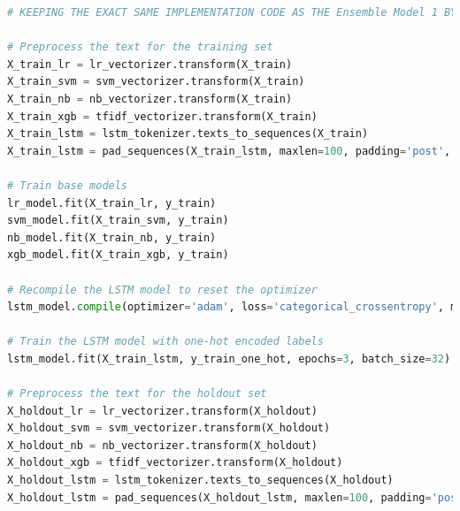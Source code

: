 \begin{tcolorbox}[colback=gray!5!white, colframe=gray!80!black, boxrule=0.5pt, title=Blending with Random Forest as Meta-Learner]
    \begin{lstlisting}[language=Python]
# KEEPING THE EXACT SAME IMPLEMENTATION CODE AS THE Ensemble Model 1 BY IMPORTING THE NECESSARY LIBRARIES, LOADING THE MODELS, AND PREPROCESSING THE DATA

# Preprocess the text for the training set
X_train_lr = lr_vectorizer.transform(X_train)
X_train_svm = svm_vectorizer.transform(X_train)
X_train_nb = nb_vectorizer.transform(X_train)
X_train_xgb = tfidf_vectorizer.transform(X_train)
X_train_lstm = lstm_tokenizer.texts_to_sequences(X_train)
X_train_lstm = pad_sequences(X_train_lstm, maxlen=100, padding='post', truncating='post')

# Train base models
lr_model.fit(X_train_lr, y_train)
svm_model.fit(X_train_svm, y_train)
nb_model.fit(X_train_nb, y_train)
xgb_model.fit(X_train_xgb, y_train)

# Recompile the LSTM model to reset the optimizer
lstm_model.compile(optimizer='adam', loss='categorical_crossentropy', metrics=['accuracy'])

# Train the LSTM model with one-hot encoded labels
lstm_model.fit(X_train_lstm, y_train_one_hot, epochs=3, batch_size=32)  # Adjust epochs and batch size as needed

# Preprocess the text for the holdout set
X_holdout_lr = lr_vectorizer.transform(X_holdout)
X_holdout_svm = svm_vectorizer.transform(X_holdout)
X_holdout_nb = nb_vectorizer.transform(X_holdout)
X_holdout_xgb = tfidf_vectorizer.transform(X_holdout)
X_holdout_lstm = lstm_tokenizer.texts_to_sequences(X_holdout)
X_holdout_lstm = pad_sequences(X_holdout_lstm, maxlen=100, padding='post', truncating='post')
\end{lstlisting}
\end{tcolorbox}
